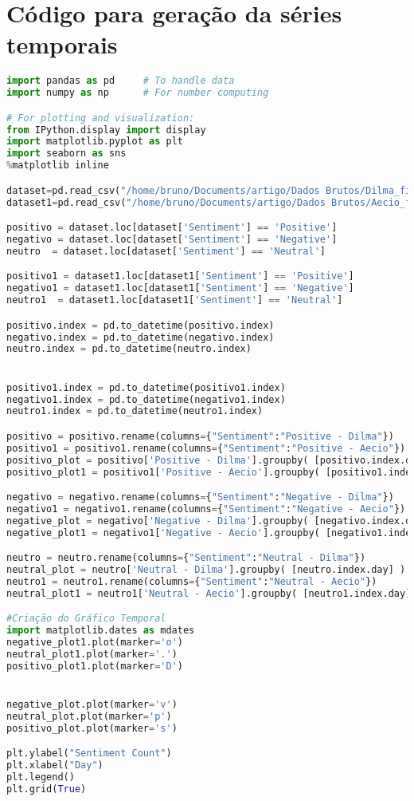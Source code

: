 \section{Código para geração da séries temporais}
\label{cod:time}
\begin{lstlisting}[language=Python]
import pandas as pd     # To handle data
import numpy as np      # For number computing

# For plotting and visualization:
from IPython.display import display
import matplotlib.pyplot as plt
import seaborn as sns
%matplotlib inline

dataset=pd.read_csv("/home/bruno/Documents/artigo/Dados Brutos/Dilma_final_prog1.csv",delimiter=",",encoding='latin-1').set_index('Date')
dataset1=pd.read_csv("/home/bruno/Documents/artigo/Dados Brutos/Aecio_final_prog1.csv",delimiter=",",encoding='latin-1').set_index('Date')

positivo = dataset.loc[dataset['Sentiment'] == 'Positive']
negativo = dataset.loc[dataset['Sentiment'] == 'Negative']
neutro  = dataset.loc[dataset['Sentiment'] == 'Neutral']

positivo1 = dataset1.loc[dataset1['Sentiment'] == 'Positive']
negativo1 = dataset1.loc[dataset1['Sentiment'] == 'Negative']
neutro1  = dataset1.loc[dataset1['Sentiment'] == 'Neutral']

positivo.index = pd.to_datetime(positivo.index)
negativo.index = pd.to_datetime(negativo.index)
neutro.index = pd.to_datetime(neutro.index)


positivo1.index = pd.to_datetime(positivo1.index)
negativo1.index = pd.to_datetime(negativo1.index)
neutro1.index = pd.to_datetime(neutro1.index)

positivo = positivo.rename(columns={"Sentiment":"Positive - Dilma"})
positivo1 = positivo1.rename(columns={"Sentiment":"Positive - Aecio"})
positivo_plot = positivo['Positive - Dilma'].groupby( [positivo.index.day] ).count()
positivo_plot1 = positivo1['Positive - Aecio'].groupby( [positivo1.index.day] ).count()

negativo = negativo.rename(columns={"Sentiment":"Negative - Dilma"})
negativo1 = negativo1.rename(columns={"Sentiment":"Negative - Aecio"})
negative_plot = negativo['Negative - Dilma'].groupby( [negativo.index.day] ).count()
negative_plot1 = negativo1['Negative - Aecio'].groupby( [negativo1.index.day] ).count()

neutro = neutro.rename(columns={"Sentiment":"Neutral - Dilma"})
neutral_plot = neutro['Neutral - Dilma'].groupby( [neutro.index.day] ).count()
neutro1 = neutro1.rename(columns={"Sentiment":"Neutral - Aecio"})
neutral_plot1 = neutro1['Neutral - Aecio'].groupby( [neutro1.index.day] ).count()

#Criação do Gráfico Temporal
import matplotlib.dates as mdates
negative_plot1.plot(marker='o')
neutral_plot1.plot(marker='.')
positivo_plot1.plot(marker='D')


negative_plot.plot(marker='v')
neutral_plot.plot(marker='p')
positivo_plot.plot(marker='s')

plt.ylabel("Sentiment Count")
plt.xlabel("Day")
plt.legend()
plt.grid(True)

\end{lstlisting}


